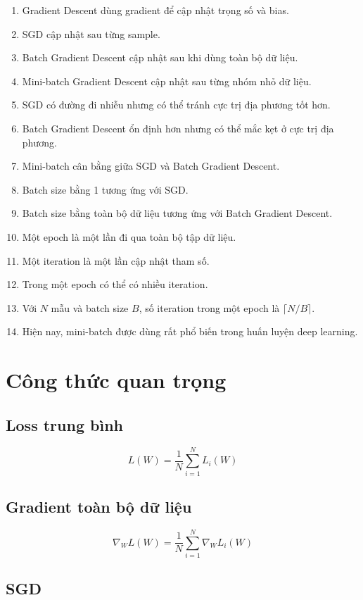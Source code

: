 \documentclass[12pt,a4paper]{report}
\begin{document}
\begin{enumerate}
    \item Gradient Descent dùng gradient để cập nhật trọng số và bias.
    \item SGD cập nhật sau từng sample.
    \item Batch Gradient Descent cập nhật sau khi dùng toàn bộ dữ liệu.
    \item Mini-batch Gradient Descent cập nhật sau từng nhóm nhỏ dữ liệu.
    \item SGD có đường đi nhiễu nhưng có thể tránh cực trị địa phương tốt hơn.
    \item Batch Gradient Descent ổn định hơn nhưng có thể mắc kẹt ở cực trị địa phương.
    \item Mini-batch cân bằng giữa SGD và Batch Gradient Descent.
    \item Batch size bằng 1 tương ứng với SGD.
    \item Batch size bằng toàn bộ dữ liệu tương ứng với Batch Gradient Descent.
    \item Một epoch là một lần đi qua toàn bộ tập dữ liệu.
    \item Một iteration là một lần cập nhật tham số.
    \item Trong một epoch có thể có nhiều iteration.
    \item Với $N$ mẫu và batch size $B$, số iteration trong một epoch là $\lceil N/B\rceil$.
    \item Hiện nay, mini-batch được dùng rất phổ biến trong huấn luyện deep learning.
\end{enumerate}

\section{Công thức quan trọng}

\subsection*{Loss trung bình}

\[
    L(W)=\frac{1}{N}\sum_{i=1}^{N}L_i(W)
\]

\subsection*{Gradient toàn bộ dữ liệu}

\[
    \nabla_W L(W)
    =
    \frac{1}{N}
    \sum_{i=1}^{N}
    \nabla_W L_i(W)
\]

\subsection*{SGD}
\end{document}
